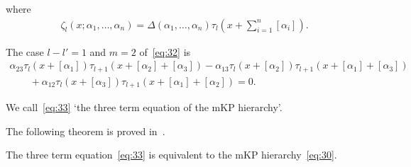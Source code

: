 \documentclass[pdftex]{sigma}
\begin{document}
where
\begin{gather*}
\zeta_l(x;\alpha_1,\dots,\alpha_n)=\Delta(\alpha_1,\dots,\alpha_n)\tau_l
\left(x+\sum_{i=1}^n[\alpha_i]\right).
\end{gather*}
\begin{example}\label{example2}
The case $l-l'=1$ and $m=2$ of~\eqref{eq:32} is
\begin{gather}
\alpha_{23}\tau_l(x+[\alpha_1])\tau_{l+1}(x+[\alpha_2]+[\alpha_3])
-\alpha_{13}\tau_l(x+[\alpha_2])\tau_{l+1}(x+[\alpha_1]+[\alpha_3])\nonumber
\\
\qquad
{}+\alpha_{12}\tau_l(x+[\alpha_3])\tau_{l+1}(x+[\alpha_1]+[\alpha_2])=0.
\label{eq:33}
\end{gather}
\end{example}

We call~\eqref{eq:33} `the three term equation of the mKP hierarchy'.

The following theorem is proved in~\cite{NT1}.
\begin{theorem}[\cite{NT1}]\label{theorem2} The three term equation~\eqref{eq:33} is equivalent to the mKP hierarchy~\eqref{eq:30}.
\end{theorem}
\end{document}
